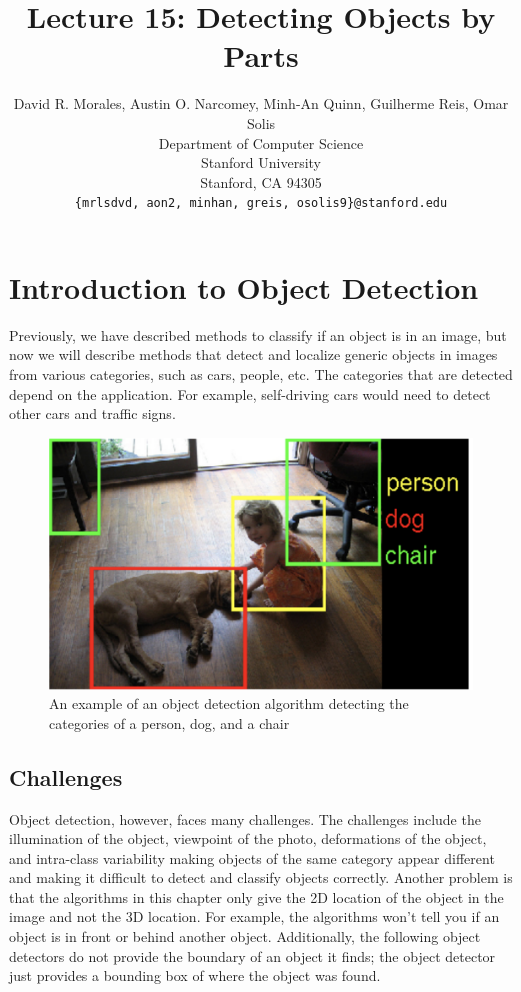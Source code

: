 \documentclass{article}
\title{Lecture 15: Detecting Objects by Parts}
\author{
  David R. Morales, Austin O. Narcomey, Minh-An Quinn, Guilherme Reis, Omar Solis \\
  Department of Computer Science\\
  Stanford University\\
  Stanford, CA 94305 \\
  \texttt{\{mrlsdvd, aon2, minhan, greis, osolis9\}@stanford.edu} 
}
\begin{document}
\maketitle


\section{Introduction to Object Detection}
Previously, we have described methods to classify if an object is in an image, but now we will describe methods that detect and localize generic objects in images from various categories, such as cars, people, etc. The categories that are detected depend on the application. For example, self-driving cars would need to detect other cars and traffic signs.
\begin{figure}[h]
	\includegraphics[width=\textwidth]{object-detector-intro.png}
    \caption{An example of an object detection algorithm detecting the categories of a person, dog, and a chair}
\end{figure}

\subsection{Challenges}
Object detection, however, faces many challenges. The challenges include the illumination of the object, viewpoint of the photo, deformations of the object, and intra-class variability making objects of the same category appear different and making it difficult to detect and classify objects correctly. Another problem is that the algorithms in this chapter only give the 2D location of the object in the image and not the 3D location. For example, the algorithms won't tell you if an object is in front or behind another object. Additionally, the following object detectors do not provide the boundary of an object it finds; the object detector just provides a bounding box of where the object was found.
\end{document}
